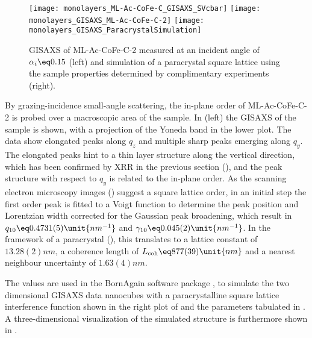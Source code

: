 \documentclass[\main/dresen_thesis.tex]{subfiles}
\begin{document}
  \label{sec:monolayers:structure:squareArrayParacrystalGISAXS}
  \begin{figure}[tb]
    \centering
    \texttt{[image: monolayers\_ML-Ac-CoFe-C\_GISAXS\_SVcbar]}
    \texttt{[image: monolayers\_GISAXS\_ML-Ac-CoFe-C-2]}
    \texttt{[image: monolayers\_GISAXS\_ParacrystalSimulation]}
    \caption{\label{fig:monolayers:structure:ML-Ac-CoFe-C-2:GISAXS}GISAXS of ML-Ac-CoFe-C-2 measured at an incident angle of $\alpha_i \eq 0.15$ (left) and simulation of a paracrystal square lattice using the sample properties determined by complimentary experiments (right).}
  \end{figure}
  By grazing-incidence small-angle scattering, the in-plane order of ML-Ac-CoFe-C-2 is probed over a macroscopic area of the sample.
  In  (left) the GISAXS of the sample is shown, with a projection of  the Yoneda band in the lower plot.
  The data show elongated peaks along $\mathit{q_z}$ and multiple sharp peaks emerging along $\mathit{q_y}$.
  The elongated peaks hint to a thin layer structure along the vertical direction, which has been confirmed by XRR in the previous section (), and the peak structure with respect to $\mathit{q_y}$ is related to the in-plane order.
  As the scanning electron microscopy images () suggest a square lattice order, in an initial step the first order peak is fitted to a Voigt function to determine the peak position and Lorentzian width corrected for the Gaussian peak broadening,  which result in $q_{10} \eq 0.4731(5) \unit{nm^{-1}}$ and $\gamma_{10} \eq 0.045(2) \unit{nm^{-1}}$.
  In the framework of a paracrystal (), this translates to a lattice constant of $13.28(2) \unit{nm}$, a coherence length of $L_{\mathrm{coh}} \eq 877(39) \unit{nm}$ and a nearest neighbour uncertainty of $1.63(4) \unit{nm}$.

  The values are used in the BornAgain software package \cite{Burle_2018_borna}, to simulate the two dimensional GISAXS data nanocubes with a paracrystalline square lattice interference function shown in the right plot of  and the parameters tabulated in .
  A three-dimensional visualization of the simulated structure is furthermore shown in .
\end{document}
